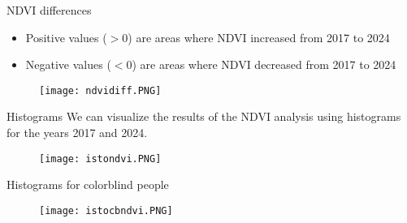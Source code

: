 \documentclass{beamer}
\begin{document}
\begin{frame}{NDVI differences}
    \begin{itemize}
        \item Positive values ($> 0$) are areas where NDVI increased from 2017 to 2024
        \item Negative values ($< 0$) are areas where NDVI decreased from 2017 to 2024
    \end{itemize}

     
\vspace{-0.3cm}
     \begin{figure}
         \centering
         \texttt{[image: ndvidiff.PNG]}
         \label{fig:enter-label}
     \end{figure}
     
\end{frame}

\begin{frame}{Histograms }
We can visualize the results of the NDVI analysis using histograms for the years 2017 and 2024.

     
\vspace{-0.3cm}
     \begin{figure}
         \centering
         \texttt{[image: istondvi.PNG]}
         \label{fig:enter-label}
     \end{figure}

\end{frame}

\begin{frame}{}
Histograms for colorblind people 

    
 \vspace{-0.3cm}
 
 \begin{figure}
     \centering
     \texttt{[image: istocbndvi.PNG]}
     \label{fig:enter-label}
 \end{figure}
\end{frame}
\end{document}
